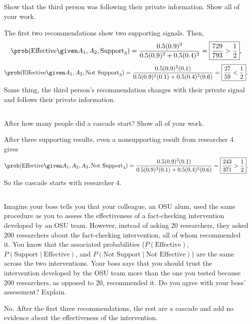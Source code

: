 \documentclass[newpages]{assignment}
\begin{document}
\subsection{}
\begin{problem}
    Show that the third person was following their private information. Show all of your work.
\end{problem}
\begin{solution}
    The first two recommendations show two supporting signals. Then,
    \[
        \prob(\text{Effective}\given A_1,A_2,\text{Support}_3)
        =\frac{0.5(0.9)^3}{0.5(0.9)^3+0.5(0.4)^3}
        =\boxed{\frac{729}{793}>\frac{1}{2}},
    \]
    \[
        \prob(\text{Effective}\given A_1,A_2,\text{Not Support}_3)
        =\frac{0.5(0.9)^2(0.1)}{0.5(0.9)^2(0.1)+0.5(0.4)^2(0.6)}
        =\boxed{\frac{27}{59}<\frac{1}{2}}.
    \]
    Same thing, the third person's recommendation changes with their private signal and follows their private information.
\end{solution}

\subsection{}
\begin{problem}
    After how many people did a cascade start? Show all of your work.
\end{problem}
\begin{solution}
    After three supporting results, even a nonsupporting result from researcher 4 gives
    \[
        \prob(\text{Effective}\given A_1,A_2,A_3,\text{Not Support}_4)
        =\frac{0.5(0.9)^3(0.1)}
        {0.5(0.9)^3(0.1)+0.5(0.4)^3(0.6)}
        =\boxed{\frac{243}{371}>\frac{1}{2}}.
    \]
    So the cascade starts with researcher 4.
\end{solution}

\subsection{}
\begin{problem}
    Imagine your boss tells you that your colleague, an OSU alum, used the same procedure as you to assess the effectiveness of a fact-checking intervention developed by an OSU team. However, instead of asking 20 researchers, they asked 200 researchers about the fact-checking intervention, all of whom recommended it. You know that the associated probabilities ($P(\text{Effective})$, $P(\text{Support}\mid\text{Effective})$, and $P(\text{Not Support}\mid\text{Not Effective})$) are the same across the two interventions. Your boss says that you should trust the intervention developed by the OSU team more than the one you tested because 200 researchers, as opposed to 20, recommended it. Do you agree with your boss' assessment? Explain.
\end{problem}
\begin{solution}
    No. After the first three recommendations, the rest are a cascade and add no evidence about the effectiveness of the intervention.
\end{solution}
\end{document}
